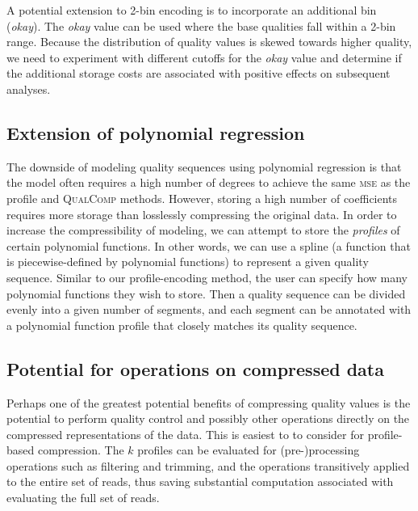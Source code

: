 \documentclass{bioinfo}
\begin{document}
A potential extension to 2-bin encoding is to incorporate an
additional bin (\emph{okay}). The \emph{okay} value can be used where
the base qualities fall within a 2-bin range. Because the distribution
of quality values is skewed towards higher quality, we need to
experiment with different cutoffs for the \emph{okay} value and
determine if the additional storage costs are associated with positive
effects on subsequent analyses.

\subsection{Extension of polynomial regression}

The downside of modeling quality sequences using polynomial regression
is that the model often requires a high number of degrees to achieve
the same \textsc{mse} as the profile and \textsc{QualComp} methods.
However, storing a high number of coefficients requires more storage
than losslessly compressing the original data. In order to increase
the compressibility of modeling, we can attempt to store the
\emph{profiles} of certain polynomial functions. In other words, we
can use a spline (a function that is piecewise-defined by polynomial
functions) to represent a given quality sequence. Similar to our
profile-encoding method, the user can specify how many polynomial
functions they wish to store. Then a quality sequence can be divided
evenly into a given number of segments, and each segment can be
annotated with a polynomial function profile that closely matches its
quality sequence.

\subsection{Potential for operations on compressed data}

Perhaps one of the greatest potential benefits of compressing quality
values is the potential to perform quality control and possibly other
operations directly on the compressed representations of the
data. This is easiest to to consider for profile-based
compression. The $k$ profiles can be evaluated for (pre-)processing
operations such as filtering and trimming, and the operations
transitively applied to the entire set of reads, thus saving
substantial computation associated with evaluating the full set of
reads.

%
%
\end{document}
